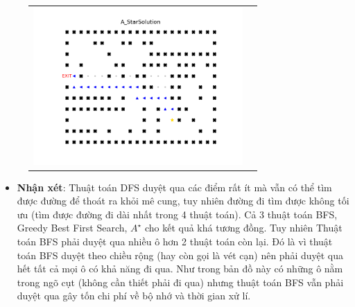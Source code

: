 \documentclass[11pt]{scrartcl} %
\begin{document}
\begin{itemize}
\begin{figure}[h]
\begin{tabular}{cc}
				\includegraphics[width=8cm]{Figures/fg1_astar.png}
			\end{tabular}
		\end{figure}
		\begin{itemize}
			\item \textbf{Nhận xét}: Thuật toán DFS duyệt qua các điểm rất ít mà vẫn có thể tìm được đường để thoát ra khỏi mê cung, tuy nhiên đường đi tìm được không tối ưu (tìm được đường đi dài nhất trong 4 thuật toán). Cả 3 thuật toán BFS, Greedy Best First Search, $A^{\star}$ cho kết quả khá tương đồng. Tuy nhiên Thuật toán BFS phải duyệt qua nhiều ô hơn 2 thuật toán còn lại. Đó là vì thuật toán BFS duyệt theo chiều rộng (hay còn gọi là vét cạn) nên phải duyệt qua hết tất cả mọi ô có khả năng đi qua. Như trong bản đồ này có những ô nằm trong ngõ cụt (không cần thiết phải đi qua) nhưng thuật toán BFS vẫn phải duyệt qua gây tốn chi phí về bộ nhớ và thời gian xử lí.
		\end{itemize}
	

\end{itemize}
\end{document}
